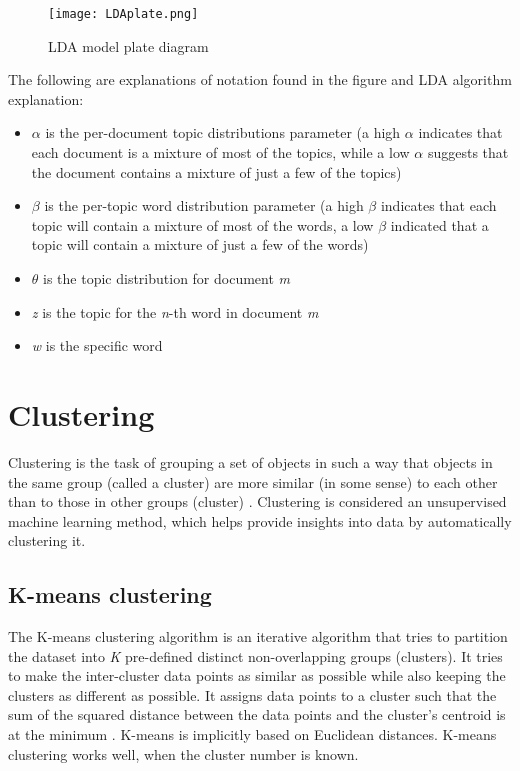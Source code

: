 \begin{figure}[H]
\begin{center}
\texttt{[image: LDAplate.png]}
\caption{LDA model plate diagram \cite{riskpaper1}}
\end{center}
\end{figure}

The following are explanations of notation found in the figure and LDA algorithm explanation:
\begin{itemize}
\item $\alpha$ is the per-document topic distributions parameter (a high
$\alpha$ indicates that each document is a mixture of most of the topics, while a low $\alpha$ suggests that the document contains a mixture of just a few of the topics)
\item $\beta$ is the per-topic word distribution parameter (a high $\beta$ indicates that each topic will contain a mixture of most of the words, a low $\beta$ indicated that a topic will contain a mixture of just a few of the words)
\item $\theta$ is the topic distribution for document \textit{m}
\item \textit{z} is the topic for the \textit{n}-th word in document \textit{m}
\item \textit{w} is the specific word
\end{itemize}

\section{Clustering}
Clustering is the task of grouping a set of objects in such a way that objects in the same group (called a cluster) are more similar (in some sense) to each other than to those in other groups (cluster) \cite{clusteringWiki}. Clustering is considered an unsupervised machine learning method, which helps provide insights into data by automatically clustering it.

\subsection{K-means clustering}
The K-means clustering algorithm is an iterative algorithm that tries to partition the dataset into \textit{K} pre-defined distinct non-overlapping groups (clusters). It tries to make the inter-cluster data points as similar as possible while also keeping the clusters as different as possible. It assigns data points to a cluster such that the sum of the squared distance between the data points and the cluster’s centroid is at the minimum \cite{kmeansexplanation}. K-means is implicitly based on Euclidean distances. K-means clustering works well, when the cluster number is known.

